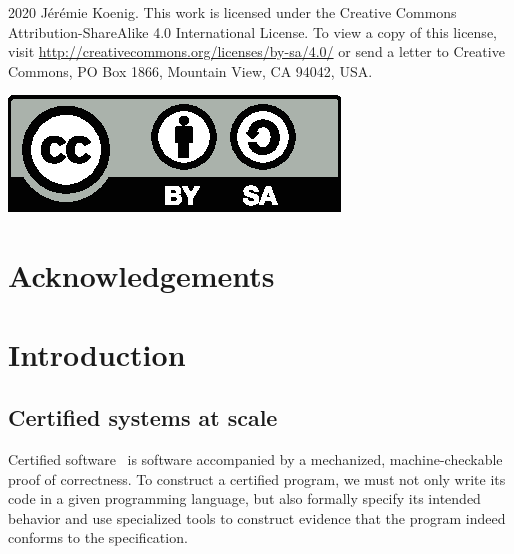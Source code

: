 \documentclass[11pt,oneside,draft]{book}
\theoremstyle{definition}
\begin{document}
\thispagestyle{empty}%
\singlespacing
\noindent
\begin{minipage}{.815\textwidth}
  \textcopyright{} 2020 J\'er\'emie Koenig.
  This work is licensed under
  the Creative Commons Attribution-ShareAlike 4.0 International License.
  To view a copy of this license,
  visit \url{http://creativecommons.org/licenses/by-sa/4.0/}
  or send a letter to
  Creative Commons, PO Box 1866, Mountain View, CA 94042, USA.
\end{minipage}
\hfill
  \includegraphics[width=.15\textwidth]{by-sa}
\doublespacing

\chapter{Acknowledgements} %


\cleardoublepage
{}
{}
\tableofcontents

\cleardoublepage
{}
{}
\listoffigures

\cleardoublepage
{}
{}
\listoftables

\mainmatter

\chapter{Introduction} %

\section{Certified systems at scale} %
\label{ssec:certsys}


Certified software~\citep{shao10}
is software accompanied by
a mechanized, machine-checkable proof of correctness.
To construct a certified program,
we must not only write its code in a given programming language,
but also formally specify its intended behavior
and use specialized tools
to construct evidence that the program
indeed conforms to the specification.

\end{document}
